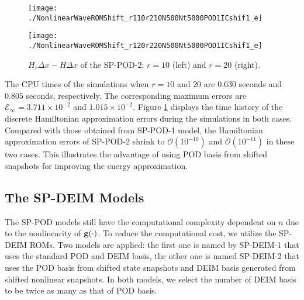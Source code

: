 \documentclass[11pt]{article}
\begin{document}
\begin{figure}[htb]
\centering
\begin{minipage}[ht]{0.45\linewidth}
\texttt{[image: ./NonlinearWaveROMShift\_r110r210N500Nt5000POD1ICshif1\_e]}
\end{minipage}
\hspace{1cm}
\begin{minipage}[ht]{0.45\linewidth}
\texttt{[image: ./NonlinearWaveROMShift\_r120r220N500Nt5000POD1ICshif1\_e]}
\end{minipage}
\caption{
$H_r\Delta x-H\Delta x$ of the SP-POD-2: $r=10$ (left) and $r=20$ (right). 
}\label{Fig: sp-pod2}
\end{figure}

The CPU times of the simulations when $r=10$ and $20$ are $0.630$ seconds and $0.805$ seconds, respectively. The corresponding maximum errors are $\mathcal{E}_\infty= 3.711\times 10^{-2}$ and $1.015\times 10^{-2}$.
Figure \ref{Fig: sp-pod2} displays the time history of the discrete Hamiltonian approximation errors during the simulations in both cases. 
Compared with those obtained from SP-POD-1 model, the Hamiltonian approximation errors of SP-POD-2 shrink to $\mathcal{O}(10^{-10})$ and $\mathcal{O}(10^{-11})$ in these two cases. This illustrates the advantage of using POD basis from shifted snapshots for improving the energy approximation. 

\subsection{The SP-DEIM Models\label{sec: SP-DEIM}} The SP-POD models still have the computational complexity dependent on $n$ due to the nonlinearity of ${\bf g}(\cdot)$. 
To reduce the computational cost, we utilize the SP-DEIM ROMs. Two models are applied: the first one is named by SP-DEIM-1 that uses the standard POD and DEIM basis, the other one is named SP-DEIM-2 that uses the POD basis from shifted state snapshots and DEIM basis generated from shifted nonlinear snapshots. 
In both models, we select the number of DEIM basis to be twice as many as that of POD basis. 
\end{document}

